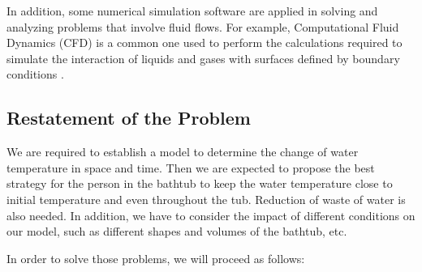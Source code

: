 \documentclass{mcmthesis}
\begin{document}
In addition, some numerical simulation software are applied in solving and analyzing problems that involve fluid flows. For example, Computational Fluid Dynamics (CFD) is a common one used to perform the calculations required to simulate the interaction of liquids and gases with surfaces defined by boundary conditions \cite{4}.

\subsection{Restatement of the Problem}

We are required to establish a model to determine the change of water temperature in space and time. Then we are expected to propose the best strategy for the person in the bathtub to keep the water temperature close to initial temperature and even throughout the tub. Reduction of waste of water is also needed. In addition, we have to consider the impact of different conditions on our model, such as different shapes and volumes of the bathtub, etc.

In order to solve those problems, we will proceed as follows:
\end{document}
